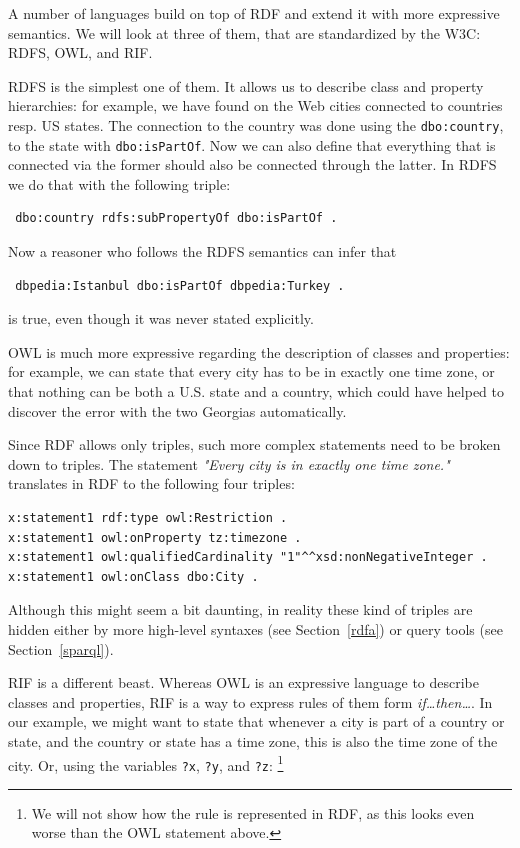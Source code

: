 \documentclass{IOS-Book-Article}
\begin{document}
A number of languages build on top of RDF and extend it with more expressive semantics.
We will look at three of them, that are standardized by the W3C: RDFS, OWL, and RIF.

RDFS is the simplest one of them.
It allows us to describe class and property hierarchies:
for example, we have found on the Web cities connected to countries resp. US states.
The connection to the country was done using the \texttt{dbo:country}, to the state with \texttt{dbo:isPartOf}.
Now we can also define that everything that is connected via the former should also be connected through the latter.
In RDFS we do that with the following triple:

\begin{verbatim}
 dbo:country rdfs:subPropertyOf dbo:isPartOf .
\end{verbatim}

Now a reasoner who follows the RDFS semantics can infer that

\begin{verbatim}
 dbpedia:Istanbul dbo:isPartOf dbpedia:Turkey .
\end{verbatim}

is true, even though it was never stated explicitly.

OWL is much more expressive regarding the description of classes and properties:
for example, we can state that every city has to be in exactly one time zone, or that nothing can be both a U.S. state and a country, which could have helped to discover the error with the two Georgias automatically.

Since RDF allows only triples, such more complex statements need to be broken down to triples.
The statement \textit{"Every city is in exactly one time zone."} translates in RDF to the following four triples:

\begin{verbatim}
x:statement1 rdf:type owl:Restriction .
x:statement1 owl:onProperty tz:timezone .
x:statement1 owl:qualifiedCardinality "1"^^xsd:nonNegativeInteger .
x:statement1 owl:onClass dbo:City .
\end{verbatim}

Although this might seem a bit daunting, in reality these kind of triples are hidden either by more high-level syntaxes (see Section~\ref{rdfa}) or query tools (see Section~\ref{sparql}).

RIF is a different beast.
Whereas OWL is an expressive language to describe classes and properties, RIF is a way to express rules of them form \textit{if\ldots{}then\ldots{}}.
In our example, we might want to state that whenever a city is part of a country or state, and the country or state has a time zone, this is also the time zone of the city. Or, using the variables \texttt{?x}, \texttt{?y}, and \texttt{?z}:%
\footnote{We will not show how the rule is represented in RDF, as this looks even worse than the OWL statement above.}
\end{document}
